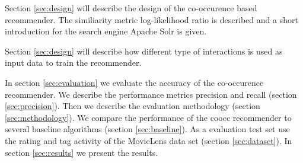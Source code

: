 Section \ref{sec:design} will describe the design of the co-occurence based recommender. The similiarity metric log-likelihood ratio is described and a short introduction for the search engine Apache Solr is given.

Section \ref{sec:design} will describe how different type of interactions is used as input data to train the recommender.

In section \ref{sec:evaluation} we evaluate the accuracy of the co-occurence recommender. We describe the performance metrics \gls{precision} and \gls{recall} (section \ref{sec:precision}). Then we describe the evaluation methodology (section \ref{sec:methodology}). We compare the performance of the \gls{coocc} recommender to several baseline algorithms (section \ref{sec:baseline}). As a evaluation test set use the rating and tag activity of the MovieLens data set (section \ref{sec:dataset}). In section \ref{sec:results} we present the results.